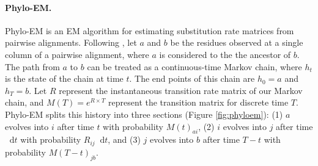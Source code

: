 \paragraph{Phylo-EM.}
Phylo-EM \parencite{holmes2002expectation} is an EM algorithm for estimating substitution rate matrices from pairwise alignments. Following \cite{holmes2002expectation}, let $a$ and $b$ be the residues observed at a single column of a pairwise alignment, where $a$ is considered to the the ancestor of $b$. The path from $a$ to $b$ can be treated as a continuous-time Markov chain, where $h_t$ is the state of the chain at time $t$. The end points of this chain are $h_0 = a$ and $h_T = b$. Let $R$ represent the instantaneous transition rate matrix of our Markov chain, and $M(T) = e^{R \times T}$ represent the transition matrix for discrete time $T$. Phylo-EM splits this history into three sections (Figure \ref{fig:phyloem}): (1) $a$ evolves into $i$ after time $t$ with probability $M(t)_{ai}$, (2) $i$ evolves into $j$ after time ${\mathop{}\!\mathrm{d}} t$ with probability $R_{ij} {\mathop{}\!\mathrm{d}} t$, and (3) $j$ evolves into $b$ after time $T-t$ with probability $M(T-t)_{jb}$.
%

